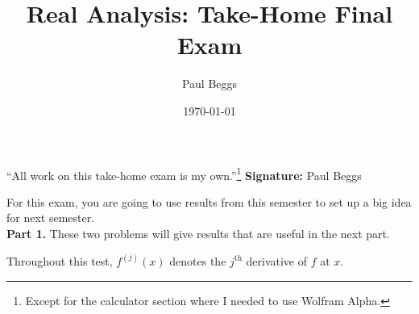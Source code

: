 \documentclass[12pt]{article}
\title{Real Analysis: Take-Home Final Exam}
\author{Paul Beggs}
\date{\today}
\begin{document}
\maketitle


``All work on this take-home exam is my own.''\footnote{Except for the calculator section where I needed to use Wolfram Alpha.} \hfill \textbf{Signature:} Paul Beggs

\vspace{0.5cm}

For this exam, you are going to use results from this semester to set up a big idea for next semester. \\

\noindent\textbf{Part 1.} These two problems will give results that are useful in the next part.

\noindent Throughout this test, \(f^{(j)}(x)\) denotes the \(j^{\text{th}}\) derivative of \(f\) at \(x\).
\end{document}
